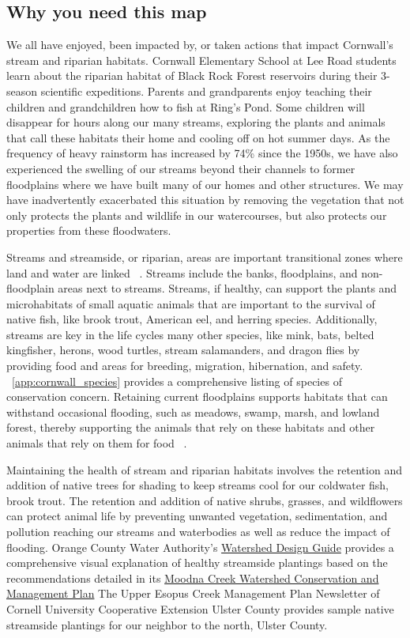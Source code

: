 \subsection*{Why you need this map}
We all have enjoyed, been impacted by, or taken actions that impact Cornwall's
stream and riparian habitats. Cornwall Elementary School at Lee Road students
learn about the riparian habitat of Black Rock Forest reservoirs during their
3-season scientific expeditions. Parents and grandparents enjoy teaching their
children and grandchildren how to fish at Ring’s Pond. Some children will
disappear for hours along our many streams, exploring the plants and animals
that call these habitats their home and cooling off on hot summer days. As the
frequency of heavy rainstorm has increased by 74\% since the 1950s, we have
also experienced the swelling of our streams beyond their channels to former
floodplains where we have built many of our homes and other structures. We may
have inadvertently exacerbated this situation by removing the vegetation that
not only protects the plants and wildlife in our watercourses, but also
protects our properties from these floodwaters.
\par
Streams and streamside, or riparian, areas are important transitional zones
where land and water are linked ~\citep{haeckel2014}. Streams include the banks,
floodplains, and non-floodplain areas next to streams. Streams, if healthy, can
support the plants and microhabitats of small aquatic animals that are
important to the survival of native fish, like brook trout, American eel, and
herring species. Additionally, streams are key in the life cycles many other
species, like mink, bats, belted kingfisher, herons, wood turtles, stream
salamanders, and dragon flies by providing food and areas for breeding,
migration, hibernation, and safety. ~\ref{app:cornwall_species}
provides a comprehensive listing of species of conservation concern. Retaining
current floodplains supports habitats that can withstand occasional flooding,
such as meadows, swamp, marsh, and lowland forest, thereby supporting the
animals that rely on these habitats and other animals that rely on them for
food ~\citep{haeckel2014}.
\par
Maintaining the health of stream and riparian habitats involves the retention
and addition of native trees for shading to keep streams cool for our coldwater
fish, brook trout. The retention and addition of native shrubs, grasses, and
wildflowers can protect animal life by preventing unwanted vegetation,
sedimentation, and pollution reaching our streams and waterbodies as well as
reduce the impact of flooding. Orange County Water Authority's
\href{https://www.orangecountygov.com/DocumentCenter/View/4135/Watershed-Design-Guide-2014-PDF}
{Watershed Design Guide} provides a comprehensive visual explanation of healthy
streamside plantings based on the recommendations detailed in its
\href{https://www.orangecountygov.com/DocumentCenter/View/4133/Moodna-Creek-Watershed-Conservation-and-Management-Plan-2010-PDF}{Moodna
Creek Watershed Conservation and Management Plan} The Upper Esopus Creek
Management Plan Newsletter of Cornell University Cooperative Extension Ulster
County provides sample native streamside plantings for our neighbor to the
north, Ulster County.

